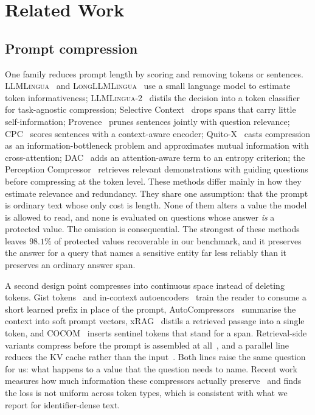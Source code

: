 \section{Related Work}
\label{sec:related}

\subsection{Prompt compression}
One family reduces prompt length by scoring and removing tokens or sentences. \textsc{LLMLingua}~\cite{llmlingua} and \textsc{LongLLMLingua}~\cite{longllmlingua}
use a small language model to estimate token informativeness; \textsc{LLMLingua-2}~\cite{llmlingua2}
distils the decision into a token classifier for task-agnostic compression;
Selective Context~\cite{selective_context} drops spans that carry little
self-information; Provence~\cite{provence} prunes sentences jointly with question
relevance; CPC~\cite{cpc} scores sentences with a context-aware encoder;
Quito-X~\cite{quitox} casts compression as an information-bottleneck problem and
approximates mutual information with cross-attention; DAC~\cite{dac} adds an
attention-aware term to an entropy criterion; the Perception
Compressor~\cite{perception_compressor} retrieves relevant demonstrations with guiding
questions before compressing at the token level. These methods differ mainly in how they
estimate relevance and redundancy. They share one assumption: that the prompt is ordinary
text whose only cost is length. None of them alters a value the model is allowed to read,
and none is evaluated on questions whose answer \emph{is} a protected value. The omission is
consequential. The strongest of these methods leaves $98.1\%$ of protected values
recoverable in our benchmark, and it preserves the answer for a query that names a sensitive
entity far less reliably than it preserves an ordinary answer span.

A second design point compresses into continuous space instead of deleting tokens. Gist
tokens~\cite{mu-gist-2023} and in-context autoencoders~\cite{ge-icae-2024} train the reader to
consume a short learned prefix in place of the prompt, AutoCompressors~\cite{chevalier-autocomp-2023}
summarise the context into soft prompt vectors, xRAG~\cite{cheng-xrag-2024} distils a retrieved
passage into a single token, and COCOM~\cite{ren-cocom-2023} inserts sentinel tokens that stand
for a span. Retrieval-side variants compress before the prompt is assembled at
all~\cite{xu-recomp-2024,liu-tcra-2023}, and a parallel line reduces the KV cache rather than the
input~\cite{zhang-h2o-2023,li-snapkv-2024}. Both lines raise the same question for us: what
happens to a value that the question needs to name. Recent work measures how much information
these compressors actually preserve~\cite{lajewska-infopres-2025} and finds the loss is not
uniform across token types, which is consistent with what we report for identifier-dense text.

